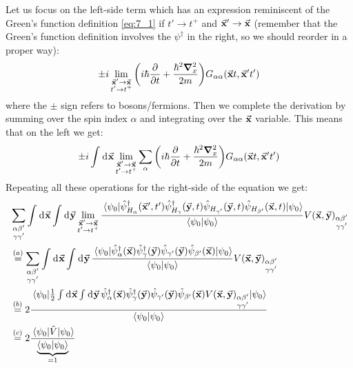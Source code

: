 \documentclass[../main/main.tex]{subfiles}
\begin{document}
Let us focus on the left-side term which has an expression reminiscent of the Green's function definition \eqref{eq:7_1} if \( t' \rightarrow t^+ \) and \( \va{x}' \rightarrow \va{x} \) (remember that the Green's function definition involves the \( \psi ^\dag  \) in the right, so we should reorder in a proper way):
\begin{equation*}
  \pm i \lim_{\substack{\va{x}' \rightarrow \va{x} \\t' \rightarrow t^+ } } \qty( i \hbar \pdv{}{t} + \frac{\hbar ^2 \grad _x^2}{2m} )
  G_{ \alpha \alpha } (\va{x}t, \va{x}' t')
\end{equation*}
where the \( \pm \) sign refers to bosons/fermions.
Then we complete the derivation by summing over the spin index \( \alpha  \) and integrating over the \( \va{x} \) variable. This means that on the left we get:
\begin{equation*}
  \pm i \int_{}^{} \dd[]{\va{x}}
  \lim_{\substack{\va{x}' \rightarrow \va{x} \\t' \rightarrow t^+ } } \sum_{\alpha }^{}  \qty( i \hbar \pdv{}{t} + \frac{\hbar ^2 \grad _x^2}{2m} )
  G_{ \alpha \alpha } (\va{x}t, \va{x}' t')
\end{equation*}
Repeating all these operations for the right-side of the equation we get:
\begin{equation*}
\begin{split}
  &\sum_{\substack{\alpha \beta'  \\ \gamma \gamma'    } }^{}
  \int_{}^{} \dd[]{\va{x}}
  \int_{}^{} \dd[]{\va{y}}
  \lim_{\substack{\va{x}' \rightarrow \va{x} \\t' \rightarrow t^+ } }
  \frac{\expval{
  \hat{\psi }_{H_ \alpha } ^\dag (\va{x}',t')
  \hat{\psi }_{H_ \gamma } ^\dag (\va{y},t)
  \hat{\psi }_{H_ {\gamma'} } (\va{y},t)
  \hat{\psi }_{H_ {\beta'} } (\va{x},t)
  }{\psi_0}
  }{\braket{\psi _0}{\psi _0} }
  V(\va{x},\va{y})_{\substack{\alpha \beta'  \\ \gamma \gamma'   } } \\
  &\overset{(a)}{=}
  \sum_{\substack{\alpha \beta'  \\ \gamma \gamma'    } }^{}
  \int_{}^{} \dd[]{\va{x}}
  \int_{}^{} \dd[]{\va{y}}
  \frac{\expval{
  \hat{\psi }_{\alpha } ^\dag (\va{x})
  \hat{\psi }_{\gamma } ^\dag (\va{y})
  \hat{\psi }_{\gamma'}  (\va{y})
  \hat{\psi }_{\beta'}  (\va{x})
  }{\psi_0}
  }{\braket{\psi _0}{\psi _0} }
  V(\va{x},\va{y})_{\substack{\alpha \beta'  \\ \gamma \gamma'   } }\\
  &\overset{(b)}{=}
  2 \frac{\expval{ \frac{1}{2}
  \int_{}^{} \dd[]{\va{x}}
  \int_{}^{} \dd[]{\va{y}}
  \hat{\psi }_{\alpha } ^\dag (\va{x})
  \hat{\psi }_{\gamma } ^\dag (\va{y})
  \hat{\psi }_{\gamma'}  (\va{y})
  \hat{\psi }_{\beta'}  (\va{x})
  V(\va{x},\va{y})_{\substack{\alpha \beta'  \\ \gamma \gamma'   } }
  }{\psi_0}  }{\braket{\psi _0}{\psi _0} } \\
  &\overset{(c)}{=}
  2 \frac{\expval{\hat{V} }{\psi_0} }{\underbrace{\braket{\psi _0}{\psi _0}}_{=1}  }
\end{split}
\end{equation*}
\end{document}
